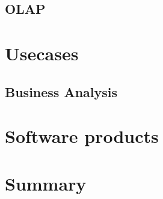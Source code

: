 \documentclass[12pt,a4paper,oneside, 
liststotoc, 					%
bibtotoc,						%
titlepage, 						%
headsepline, 					%
BCOR6mm,						%
openany,							%
]{scrreprt}
\begin{document}
\section{OLAP}\label{olap}

\chapter{Usecases}\label{usecases}
\section{Business Analysis}\label{ba}
\chapter{Software products}\label{software}
\chapter{Summary}
  
\printbibliography


\begin{appendix}
\clearpage
{}						%
\end{appendix}
\end{document}
